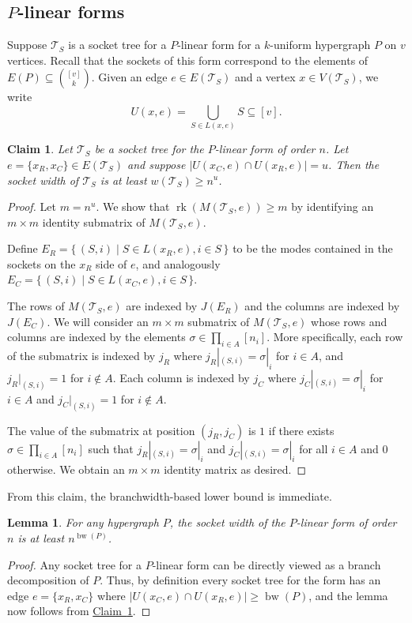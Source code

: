 \documentclass[11pt]{article}
\numberwithin{equation}{section}
\newtheorem{lemma}[theorem]{Lemma}
\newtheorem{claim}[theorem]{Claim}
\theoremstyle{definition}
\theoremstyle{plain}
\newcommand{\expref}[2]{\hyperref[#2]{#1~\ref{#2}}}
\DeclareMathOperator{\bw}{bw}
\newcommand{\rk}{\ensuremath{\operatorname{rk}}}
\newcommand{\ts}{\ensuremath{\mathcal{T}_S}}
\begin{document}
%
\subsection{\texorpdfstring{$P$-linear}{P-linear} forms}

Suppose $\ts$ is a socket tree for a $P$-linear form for a $k$-uniform
hypergraph $P$ on $v$ vertices.
Recall that the sockets of this form correspond to the elements
of $E(P) \subseteq \binom{[v]}{k}$.
Given an edge $e \in E(\ts)$ and a vertex $x
\in V(\ts)$, we write \[U(x, e)=\bigcup_{S \in L(x,e)} S \subseteq [v].\]

\begin{claim}
  \label{claim:binom form sockwidth lb 1}
  Let $\ts$ be a socket tree for the $P$-linear form of order $n$.
  Let $e =
  \{x_R, x_C\} \in E(\ts)$ and suppose $|U(x_C, e) \cap U(x_R, e)|= u$.
  Then the socket width of $\ts$ is at least $w(\ts) \ge n^{u}$.

\end{claim}

\begin{proof}
  Let $m = n^u$. We show that $\rk(M(\ts, e)) \ge
  m$ by identifying an $m \times m$ identity submatrix of $M(\ts, e)$.

  Define $E_R = \{\,(S, i) \mid S \in L(x_R, e), i \in S\,\}$
  to be the modes contained in the sockets on the $x_R$ side of $e$, and analogously %
  $E_C
  = \{\,(S, i) \mid S \in L(x_C, e), i \in S\,\}$.

  The rows of $M(\ts, e)$ are indexed by $J(E_R)$ and the columns are indexed by $J(E_C)$. We will consider an $m \times m$ submatrix of $M(\ts, e)$ whose rows and columns are indexed by the elements $\sigma \in \prod_{i \in A} [n_i]$. More specifically, each row of the submatrix is indexed by $j_R$ where $j_R|_{(S,i)}=\sigma|_i$ for $i \in A$, and $j_R|_{(S,i)} = 1$ for $i \not \in A$. Each column is indexed by $j_C$ where $j_C|_{(S,i)}=\sigma|_i$ for $i \in A$ and $j_C|_{(S,i)}=1$  for $i \not \in A$.

The value of the submatrix at position $(j_{R}, j_{C})$ is $1$ if there exists $\sigma \in \prod_{i \in A} [n_i]$ such that $j_R|_{(S,i)}=\sigma|_i$ and $j_C|_{(S,i)}=\sigma|_i$ for all $i \in A$ and $0$ otherwise. We obtain
  an $m \times m$ identity matrix as desired.
\end{proof}

From this claim, the branchwidth-based lower bound is immediate.

\begin{lemma}
  \label{lem:lb-binom-2}
  For any hypergraph $P$, the socket width of the $P$-linear form
  of order $n$ is at least $n^{\bw(P)}$.
\end{lemma}
\begin{proof}
  Any socket tree for a $P$-linear form can be directly
  viewed as a branch decomposition of $P$.  Thus, by definition every
  socket tree for the form has an edge $e = \{x_R, x_C\}$ where
  $|U(x_C,e) \cap U(x_R,e)| \ge \bw(P)$, and the lemma now follows
  from \expref{Claim}{claim:binom form sockwidth lb 1}.
\end{proof}
\end{document}
